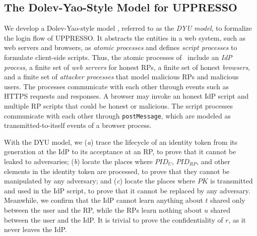 

\subsection{The Dolev-Yao-Style Model for UPPRESSO}
\label{dy-model}
We develop a Dolev-Yao-style model \cite{SPRESSO},
    referred to as the \emph{DYU model},
to formalize the login flow of UPPRESSO. %
It abstracts the entities in a web system, such as web servers and browsers, as \emph{atomic processes} %
and defines \emph{script processes} to formulate client-side scripts.
Thus, the atomic processes of \usso~include an {\em IdP process}, a finite set of {\em web servers} for honest RPs, a finite set of honest {\em browsers}, and a finite set of {\em attacker processes} that model malicious RPs and malicious users. The processes communicate with each other through events such as HTTPS requests and responses.
A browser may invoke an honest IdP script and multiple RP scripts that could be honest or malicious.
The script processes communicate with each other through \verb+postMessage+, which are modeled as transmitted-to-itself events of a browser process.

\newc
With the DYU model, we (\emph{a}) trace the lifecycle of an identity token from its generation at the IdP to its acceptance at an RP, to prove that it cannot be leaked to adversaries;
(\emph{b}) locate the places where $PID_U$, $PID_{RP}$, and other elements in the identity token are processed,
 to prove that they cannot be manipulated by any adversary; and (\emph{c}) locate the places
  where $PK$ is transmitted and used in the IdP script,
to prove that it cannot be replaced by any adversary.
Meanwhile, we confirm that the IdP cannot learn anything about $t$ shared only between the user and the RP,
 while the RPs learn nothing about $u$ shared between the user and the IdP.
It is trivial to prove the confidentiality of $r$, as it never leaves the IdP.

